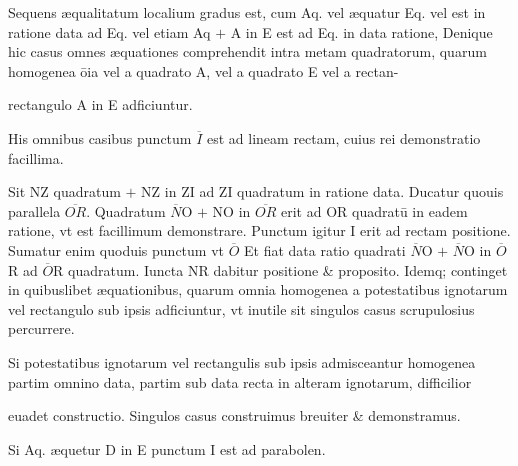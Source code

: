 \documentclass[11pt,a4paper]{article}
\begin{document}
Sequens æqualitatum localium gradus est, cum Aq. vel æquatur Eq. vel est in ratione data ad Eq. vel etiam Aq $+$ A in E est ad Eq. in data ratione, Denique hic casus omnes æquationes comprehendit intra metam quadratorum, quarum homogenea ōia vel a quadrato A, vel a quadrato E vel a rectan-


rectangulo A in E adficiuntur.

His omnibus casibus punctum $\overline{I}$ est ad lineam rectam, cuius rei demonstratio facillima.

Sit NZ quadratum $+$ NZ in ZI ad ZI quadratum in ratione data. Ducatur quouis parallela $\overline{OR}$. Quadratum $\overline{N}$O $+$ NO in $\overline{OR}$ erit ad OR quadratū in eadem ratione, vt est facillimum demonstrare. Punctum igitur I erit ad rectam positione. Sumatur enim quoduis punctum vt $\overline{O}$ Et fiat data ratio quadrati $\overline{N}$O $+$ $\overline{N}$O in $\overline{O}$R ad $\overline{O}$R quadratum. Iuncta NR dabitur positione \&  proposito. Idemq; continget in quibuslibet æquationibus, quarum omnia homogenea a potestatibus ignotarum vel rectangulo sub ipsis adficiuntur, vt inutile sit singulos casus scrupulosius percurrere.

Si potestatibus ignotarum vel rectangulis sub ipsis admisceantur homogenea partim omnino data, partim sub data recta in alteram ignotarum, difficilior


euadet constructio. Singulos casus construimus breuiter \& demonstramus.

Si Aq. æquetur D in E punctum I est ad parabolen.
\end{document}
